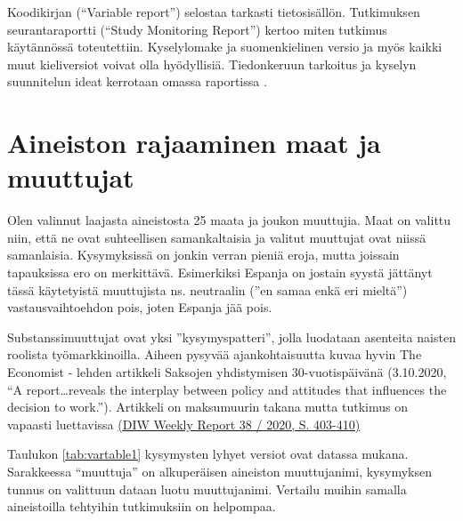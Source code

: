 \documentclass[
  finnish,
]{book}
\begin{document}
Koodikirjan (``Variable report'') \citep{RefWorks:doc:5bb9041be4b06677e5e61f83} selostaa
tarkasti tietosisällön. Tutkimuksen seurantaraportti (``Study Monitoring Report'')
\citep{RefWorks:doc:5c053d69e4b0191a580d6451} kertoo miten tutkimus käytännössä
toteutettiin. Kyselylomake \citep{RefWorks:doc:5bb9044fe4b0dfeb95352229} ja
suomenkielinen versio \citep{RefWorks:doc:5bb90a0ae4b018435936a488} ja myös kaikki muut
kieliversiot voivat olla hyödyllisiä. Tiedonkeruun tarkoitus ja kyselyn
suunnitelun ideat kerrotaan omassa raportissa \citep{RefWorks:doc:5f9439fde4b04741789a2187}.

\hypertarget{aineiston-rajaaminen-maat-ja-muuttujat}{%
\section{Aineiston rajaaminen maat ja muuttujat}\label{aineiston-rajaaminen-maat-ja-muuttujat}}

Olen valinnut laajasta aineistosta 25 maata ja joukon muuttujia. Maat on valittu
niin, että ne ovat suhteellisen samankaltaisia ja valitut muuttujat ovat niissä
samanlaisia. Kysymyksissä on jonkin verran pieniä eroja, mutta joissain
tapauksissa ero on merkittävä. Esimerkiksi Espanja on jostain syystä jättänyt
tässä käytetyistä muuttujista ns. neutraalin (''en samaa enkä eri mieltä'')
vastausvaihtoehdon pois, joten Espanja jää pois.

Substanssimuuttujat ovat yksi ''kysymyspatteri'', jolla luodataan asenteita
naisten roolista työmarkkinoilla. Aiheen pysyvää ajankohtaisuutta kuvaa hyvin
The Economist - lehden artikkeli Saksojen yhdistymisen 30-vuotispäivänä
(3.10.2020, ``A report\ldots reveals the interplay between policy and attitudes that
influences the decision to work.'').
Artikkeli on maksumuurin takana mutta tutkimus on vapaasti
luettavissa
\href{https://www.diw.de/de/diw_01.c.799302.de/publikationen/weekly_reports/2020_38_1/mothers_in_eastern_and_western_germany__employment_rates_and_attitudes_are_converging__full-time_employment_is_not.html}{(DIW Weekly Report 38 / 2020, S. 403-410)}

Taulukon \ref{tab:vartable1} kysymysten lyhyet versiot ovat datassa mukana.
Sarakkeessa ``muuttuja'' on alkuperäisen aineiston muuttujanimi,
kysymyksen tunnus on valittuun dataan luotu muuttujanimi. Vertailu muihin samalla
aineistoilla tehtyihin tutkimuksiin on helpompaa.
\end{document}
